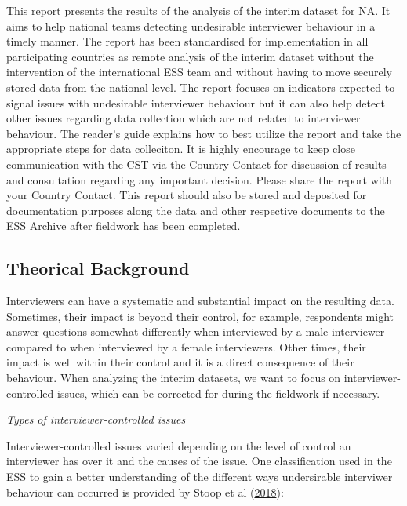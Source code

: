 \documentclass[
  11pt,
  a4paperpaper,
]{article}
\begin{document}
This report presents the results of the analysis of the interim dataset
for NA. It aims to help national teams detecting undesirable interviewer
behaviour in a timely manner. The report has been standardised for
implementation in all participating countries as remote analysis of the
interim dataset without the intervention of the international ESS team
and without having to move securely stored data from the national level.
The report focuses on indicators expected to signal issues with
undesirable interviewer behaviour but it can also help detect other
issues regarding data collection which are not related to interviewer
behaviour. The reader's guide explains how to best utilize the report
and take the appropriate steps for data colleciton. It is highly
encourage to keep close communication with the CST via the Country
Contact for discussion of results and consultation regarding any
important decision. Please share the report with your Country Contact.
This report should also be stored and deposited for documentation
purposes along the data and other respective documents to the ESS
Archive after fieldwork has been completed.

\hypertarget{theorical-background}{%
\subsection{Theorical Background}\label{theorical-background}}

Interviewers can have a systematic and substantial impact on the
resulting data. Sometimes, their impact is beyond their control, for
example, respondents might answer questions somewhat differently when
interviewed by a male interviewer compared to when interviewed by a
female interviewers. Other times, their impact is well within their
control and it is a direct consequence of their behaviour. When
analyzing the interim datasets, we want to focus on
interviewer-controlled issues, which can be corrected for during the
fieldwork if necessary.

\emph{Types of interviewer-controlled issues}

Interviewer-controlled issues varied depending on the level of control
an interviewer has over it and the causes of the issue. One
classification used in the ESS to gain a better understanding of the
different ways undersirable interviwer behaviour can occurred is
provided by Stoop et al (\protect\hyperlink{ref-stoop2018}{2018}):
\end{document}
